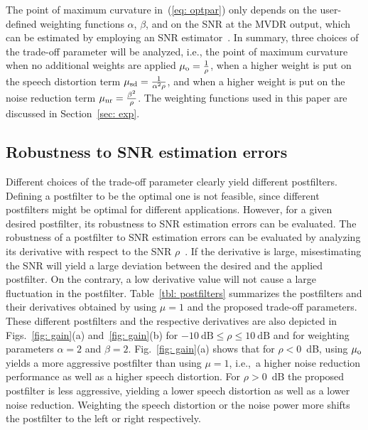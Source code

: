 \documentclass[10pt]{IEEEtran}
\begin{document}
The point of maximum curvature in~(\ref{eq: optpar}) only depends on the user-defined weighting functions $\alpha$, $\beta$, and on the SNR at the MVDR output, which can be estimated by employing an SNR estimator~\cite{Martin_ITSAP_2001,Cohen_ITSAP_2003,Gerkmann_ITASLP_2012,Ephraim_ITASSP_1984,Breihaupt_ICASSP_2008}. \newline
In summary, three choices of the trade-off parameter will be analyzed, i.e., the point of maximum curvature when no additional weights are applied $\mu_{\rm o} = \frac{1}{\rho}$, when a higher weight is put on the speech distortion term $\mu_{\rm sd} = \frac{1}{\alpha^2 \rho}$, and when a  higher weight is put on the noise reduction term $\mu_{\rm nr} = \frac{\beta^2}{\rho}$. 
The weighting functions used in this paper are discussed in Section~\ref{sec: exp}.
\subsection{Robustness to SNR estimation errors}
Different choices of the trade-off parameter clearly yield different postfilters.
Defining a postfilter to be the optimal one is not feasible, since different postfilters might be optimal for different applications.
However, for a given desired postfilter, its robustness to SNR estimation errors can be evaluated.
The robustness of a postfilter to SNR estimation errors can be evaluated by analyzing its derivative with respect to the SNR $\rho$~\cite{Demiroglu_thesis,Whitehead_ICASSP_2011}.
If the derivative is large, misestimating the SNR will yield a large deviation between the desired and the applied postfilter. On the contrary, a low derivative value will not cause a large fluctuation in the postfilter. \newline
Table~\ref{tbl: postfilters} summarizes the postfilters and their derivatives obtained by using $\mu = 1$ and the proposed trade-off parameters.
These different postfilters and the respective derivatives are also depicted in Figs.~\ref{fig: gain}(a) and~\ref{fig: gain}(b) for $-10~\text{dB} \leq \rho \leq 10~{\text{dB}}$ and for weighting parameters $\alpha = 2$ and $\beta = 2$.
Fig.~\ref{fig: gain}(a) shows that for $\rho < 0$~dB, using $\mu_{\rm o}$ yields a more aggressive postfilter than using $\mu = 1$, i.e.,~a higher noise reduction performance as well as a higher speech distortion.
For $\rho > 0$~dB the proposed postfilter is less aggressive, yielding a lower speech distortion as well as a lower  noise reduction.
Weighting the speech distortion or the noise power more shifts the postfilter to the left or right respectively.  
\end{document}
